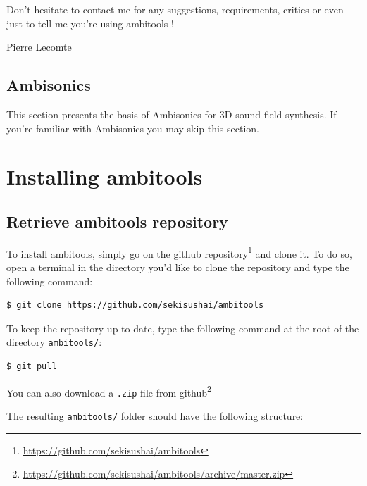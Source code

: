 \documentclass[10pt,a4paper]{article}
\begin{document}
Don't hesitate to contact me for any suggestions, requirements, critics or even just to tell me you're using ambitools !

\begin{flushright}
Pierre Lecomte
\end{flushright}

\subsection{Ambisonics}
This section presents the basis of Ambisonics for 3D sound field synthesis. If you're familiar with Ambisonics you may skip this section.

\section{Installing ambitools}

\subsection{Retrieve ambitools repository}
To install ambitools, simply go on the github repository\footnote{\url{https://github.com/sekisushai/ambitools}} and clone it. To do so, open a terminal in the directory you'd like to clone the repository and type the following command:

\begin{lstlisting}
$ git clone https://github.com/sekisushai/ambitools
\end{lstlisting}

To keep the repository up to date, type the following command at the root of the directory \lstinline`ambitools/`:

\begin{lstlisting}
$ git pull
\end{lstlisting}

You can also download a \lstinline'.zip' file from github\footnote{\url{https://github.com/sekisushai/ambitools/archive/master.zip}}

The resulting \lstinline'ambitools/' folder should have the following structure:
\end{document}
